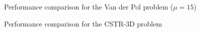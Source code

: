 \begin{figure}[H]
    \centering
    \caption{Performance comparison for the Van der Pol problem ($\mathit{\mu = 15}$)}
    \label{9_mu_15}
\end{figure}

\begin{figure}[H]
    \centering
    \caption{Performance comparison for the CSTR-3D problem}
    \label{9_3D}
\end{figure}

